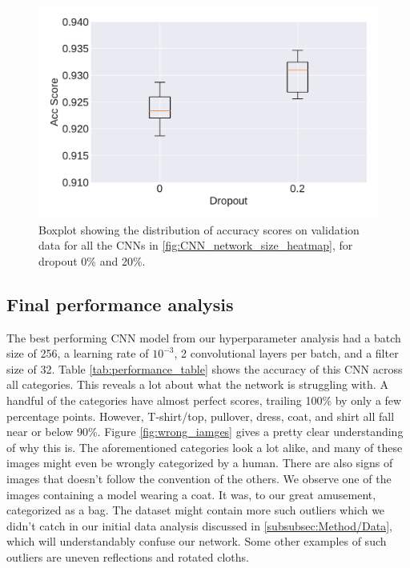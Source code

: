 \documentclass[10pt, twocolumn]{article}
\begin{document}
\begin{figure}[H]
    \centering
\includegraphics[scale=0.4]{figs/CNN_dropout_boxplot.pdf}
    \caption{Boxplot showing the distribution of accuracy scores on validation data for all the CNNs in \cref{fig:CNN_network_size_heatmap}, for dropout 0\% and 20\%.}
    \label{fig:CNN_dropout_boxplot}
\end{figure}



\subsection{Final performance analysis}
The best performing CNN model from our hyperparameter analysis had a batch size of 256, a learning rate of $10^{-3}$, 2 convolutional layers per batch, and a filter size of 32. Table \ref{tab:performance_table} shows the accuracy of this CNN across all categories. This reveals a lot about what the network is struggling with. A handful of the categories have almost perfect scores, trailing 100\% by only a few percentage points. However, T-shirt/top, pullover, dress, coat, and shirt all fall near or below 90\%. Figure \ref{fig:wrong_iamges} gives a pretty clear understanding of why this is. The aforementioned categories look a lot alike, and many of these images might even be wrongly categorized by a human. There are also signs of images that doesn't follow the convention of the others. We observe one of the images containing a model wearing a coat. It was, to our great amusement, categorized as a bag. The dataset might contain more such outliers which we didn't catch in our initial data analysis discussed in \cref{subsubsec:Method/Data}, which will understandably confuse our network. Some other examples of such outliers are uneven reflections and rotated cloths.
\end{document}
